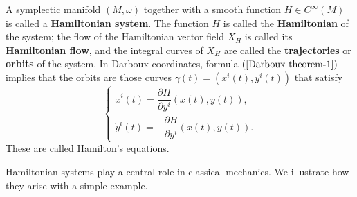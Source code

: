 A symplectic manifold $(M,\omega)$ together with a smooth function $H\in C^\infty(M)$ is called a \textbf{Hamiltonian system}. The function $H$ is called the \textbf{Hamiltonian} of the system; the flow of the Hamiltonian vector field $X_H$ is called its \textbf{Hamiltonian flow}, and the integral curves of $X_H$ are called the \textbf{trajectories} or \textbf{orbits} of the system. In Darboux coordinates, formula $(\ref{Darboux theorem-1})$ implies that the orbits are those curves $\gamma(t)=(x^i(t),y^i(t))$ that satisfy
\begin{equation}\label{Hamilton's equations}
\left\{
\begin{array}{l}
\dot{x}^i(t)=\dfrac{\partial H}{\partial y^i}(x(t),y(t)),\\[8pt]
\dot{y}^i(t)=-\dfrac{\partial H}{\partial y^i}(x(t),y(t)).
\end{array}
\right.
\end{equation}
These are called Hamilton's equations.\par
Hamiltonian systems play a central role in classical mechanics. We illustrate how they arise with a simple example.
